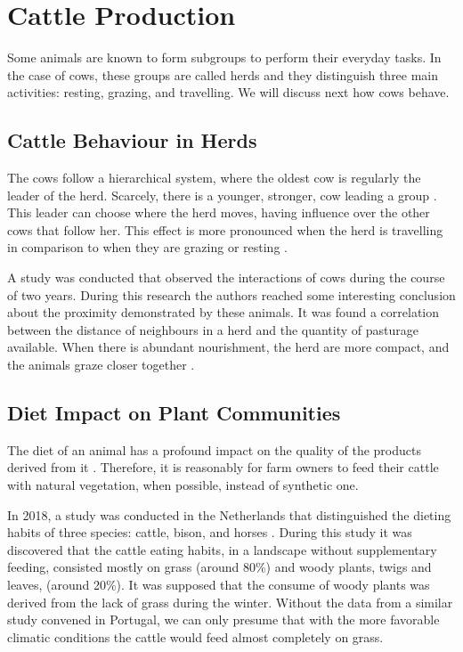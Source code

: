 


\section{Cattle Production}
\label{sec:cows}
Some animals are known to form subgroups to perform their everyday tasks. In the case of
cows, these groups are called herds and they distinguish three main activities: resting,
grazing, and travelling. We will discuss next how cows behave.

\subsection{Cattle Behaviour in Herds}
\label{subsec:behaviour_herds}
The cows follow a hierarchical system, where the oldest cow is regularly the leader of the
herd. Scarcely, there is a younger, stronger, cow leading a group \cite{Harris2007}. This
leader can choose where the herd moves, having influence over the other cows that follow her.
This effect is more pronounced when the herd is travelling in comparison to when they are
grazing or resting \cite{Vsarova2010}.

A study was conducted that observed the interactions of cows during the course of two
years. During this research the authors reached some interesting conclusion about the proximity
demonstrated by these animals. It was found a correlation between the distance of neighbours
in a herd and the quantity of pasturage available. When there is abundant nourishment, the
herd are more compact, and the animals graze closer together \cite{Harris2007}.

\subsection{Diet Impact on Plant Communities}
\label{subsec:diet}
The diet of an animal has a profound impact on the quality of the products derived from it \cite{Araujo2014}.
Therefore, it is reasonably for farm owners to feed their cattle with natural vegetation, when
possible, instead of synthetic one.

In 2018, a study was conducted in the Netherlands that distinguished the dieting habits of
three species: cattle, bison, and horses \cite{Cromsigt2018}. During this study it was
discovered that the cattle eating habits, in a landscape without supplementary feeding,
consisted mostly on grass (around 80\%) and woody plants, twigs and leaves, (around 20\%). It
was supposed that the consume of woody plants was derived from the lack of grass during the
winter. Without the data from a similar study convened in Portugal, we can only presume that
with the more favorable climatic conditions the cattle would feed almost completely on grass.

